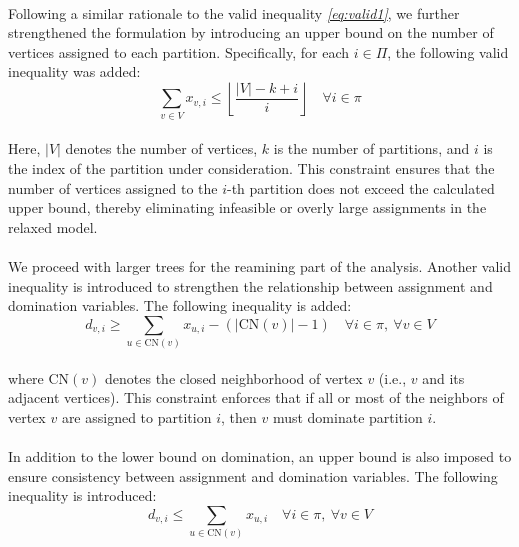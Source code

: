 \paragraph{} Following a similar rationale to the valid inequality \textsl{\eqref{eq:valid1}}, we further strengthened the formulation by introducing an upper bound on the number of vertices assigned to each partition. Specifically, for each $i \in \Pi$, the following valid inequality was added:
\begin{equation}
    \sum_{v \in V} x_{v,i} \leq \left\lfloor \frac{|V| - k + i}{i} \right\rfloor \quad \forall i \in \pi \label{eq:valid2}
\end{equation}

\paragraph{} Here, $|V|$ denotes the number of vertices, $k$ is the number of partitions, and $i$ is the index of the partition under consideration. This constraint ensures that the number of vertices assigned to the $i$-th partition does not exceed the calculated upper bound, thereby eliminating infeasible or overly large assignments in the relaxed model.


\paragraph{} We proceed with larger trees for the reamining part of the analysis. Another valid inequality is introduced to strengthen the relationship between assignment and domination variables. The following inequality is added:
\begin{equation}
    d_{v,i} \geq \sum_{u \in \text{CN}(v)} x_{u,i} - \left( |\text{CN}(v)| - 1 \right) \quad \forall i \in \pi,\ \forall v \in V
\end{equation}

\paragraph{} where $\text{CN}(v)$ denotes the closed neighborhood of vertex $v$ (i.e., $v$ and its adjacent vertices). This constraint enforces that if all or most of the neighbors of vertex $v$ are assigned to partition $i$, then $v$ must dominate partition $i$.

\paragraph{} In addition to the lower bound on domination, an upper bound is also imposed to ensure consistency between assignment and domination variables. The following inequality is introduced:
\begin{equation}
    d_{v,i} \leq \sum_{u \in \text{CN}(v)} x_{u,i}  \quad \forall i \in \pi,\ \forall v \in V
\end{equation}


